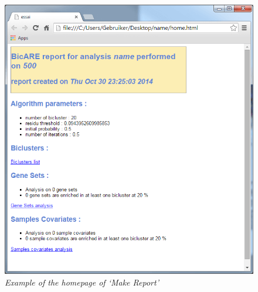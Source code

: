\documentclass[a4paper]{article}\usepackage[]{graphicx}\usepackage[]{color}
\begin{document}
\begin{figure}[H]
\centering
\includegraphics[scale=0.4]{figures/bicare_example3.png}
\caption{{\it Example of the homepage of `Make Report'}\label{bicare_example3}}
\end{figure}
\end{document}
